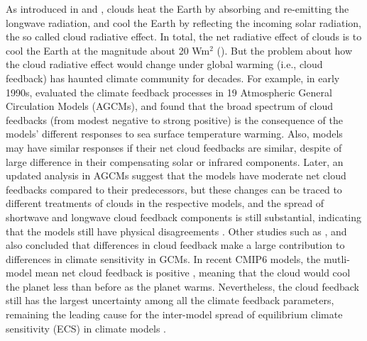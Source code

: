 As introduced in  and , clouds heat the Earth by absorbing and re-emitting the longwave radiation, and cool the Earth by reflecting the incoming solar radiation, the so called cloud radiative effect. In total, the net radiative effect of clouds is to cool the Earth at the magnitude about 20 Wm$^2$ (). But the problem about how the cloud radiative effect would change under global warming (i.e., cloud feedback) has haunted climate community for decades. For example, in early 1990s, \cite{Cess1990intercomparison} evaluated the climate feedback processes in 19 Atmospheric General Circulation Models (AGCMs), and found that the broad spectrum of cloud feedbacks (from modest negative to strong positive) is the consequence of the models' different responses to sea surface temperature warming. Also, models may have similar responses if their net cloud feedbacks are similar, despite of large difference in their compensating solar or infrared components. Later, an updated analysis in AGCMs suggest that the models have moderate net cloud feedbacks compared to their predecessors, but these changes can be traced to different treatments of clouds in the respective models, and the spread of shortwave and longwave cloud feedback components is still substantial, indicating that the models still have physical disagreements \citep{Cess1996cloud}. Other studies such as \cite{Colman2003comparison}, \cite{Webb2006contribution} and \cite{Vial2013} also concluded that differences in cloud feedback make a large contribution to differences in climate sensitivity in GCMs. In recent CMIP6 models, the mutli-model mean net cloud feedback is positive \citep[see ;][]{Zelinka2020causes}, meaning that the cloud would cool the planet less than before as the planet warms. Nevertheless, the cloud feedback still has the largest uncertainty among all the climate feedback parameters,  remaining the leading cause for the inter-model spread of equilibrium climate sensitivity (ECS) in climate models \citep{Zelinka2020causes,Sherwood2020}. %


